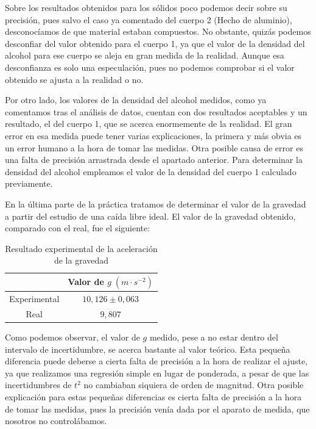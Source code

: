 \documentclass[a4paper,12pt,titlepage]{article}
\begin{document}
Sobre los resultados obtenidos para los sólidos poco podemos decir sobre su precisión, pues salvo el caso ya comentado del cuerpo 2 (Hecho de aluminio), desconocíamos de que material estaban compuestos. No obstante, quizás podemos desconfiar del valor obtenido para el cuerpo 1, ya que el valor de la densidad del alcohol para ese cuerpo se aleja en gran medida de la realidad. Aunque esa desconfianza es solo una especulación, pues no podemos comprobar si el valor obtenido se ajusta a la realidad o no.

\par Por otro lado, los valores de la densidad del alcohol medidos, como ya comentamos tras el análisis de datos, cuentan con dos resultados aceptables y un resultado, el del cuerpo 1, que se acerca enormemente de la realidad. El gran error en esa medida puede tener varias explicaciones, la primera y más obvia es un error humano a la hora de tomar las medidas. Otra posible causa de error es una falta de precisión arrastrada desde el apartado anterior. Para determinar la densidad del alcohol empleamos el valor de la densidad del cuerpo 1 calculado previamente.

\par En la última parte de la práctica tratamos de determinar el valor de la gravedad a partir del estudio de una caída libre ideal. El valor de la gravedad obtenido, comparado con el real, fue el siguiente:

\begin{table}[h!]
    \centering
    \begin{tabular}{c|c|}
    \cline{2-2}
                           & Valor de $g \; (m\cdot s^{-2})$\\ \hline
    \multicolumn{1}{|c|}{Experimental} &  $10,126 \pm 0,063$\\ \hline
    \multicolumn{1}{|c|}{Real} & $9,807$ \\ \hline
    \end{tabular}
    \caption{Resultado experimental de la aceleración de la gravedad}
    \label{tab:my-tabled}
    \end{table}

Como podemos observar, el valor de $g$ medido, pese a no estar dentro del intervalo de incertidumbre, se acerca bastante al valor teórico. Esta pequeña diferencia puede deberse a cierta falta de precisión a la hora de realizar el ajuste, ya que realizamos una regresión simple en lugar de ponderada, a pesar de que las incertidumbres de $t^2$ no cambiaban siquiera de orden de magnitud. Otra posible explicación para estas pequeñas diferencias es cierta falta de precisión a la hora de tomar las medidas, pues la precisión venía dada por el aparato de medida, que nosotros no controlábamos.
\end{document}
